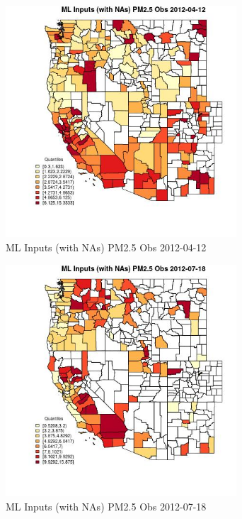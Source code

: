 \begin{figure} 
\centering  
\includegraphics[width=0.77\textwidth]{Code_Outputs/Report_ML_input_PM25_Step4_part_e_de_duplicated_aves_compiled_2019-05-14wNAs_CountyPM25_ObsMean2012-04-12_2012-04-12.jpg} 
\caption{\label{fig:Report_ML_input_PM25_Step4_part_e_de_duplicated_aves_compiled_2019-05-14wNAsCountyPM25_ObsMean2012-04-12_2012-04-12}ML Inputs (with NAs) PM2.5 Obs 2012-04-12} 
\end{figure} 
 

\begin{figure} 
\centering  
\includegraphics[width=0.77\textwidth]{Code_Outputs/Report_ML_input_PM25_Step4_part_e_de_duplicated_aves_compiled_2019-05-14wNAs_CountyPM25_ObsMean2012-07-18_2012-07-18.jpg} 
\caption{\label{fig:Report_ML_input_PM25_Step4_part_e_de_duplicated_aves_compiled_2019-05-14wNAsCountyPM25_ObsMean2012-07-18_2012-07-18}ML Inputs (with NAs) PM2.5 Obs 2012-07-18} 
\end{figure} 
 


